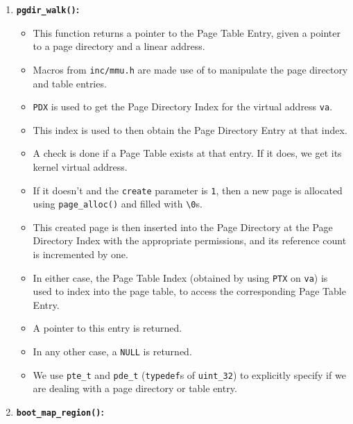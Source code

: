 \documentclass[]{article}
\begin{document}
\begin{enumerate}
\def\labelenumi{\arabic{enumi}.}
\itemsep1pt\parskip0pt
\item
  \textbf{\texttt{pgdir\_walk()}:}

  \begin{itemize}
  \itemsep1pt\parskip0pt
  \item
    This function returns a pointer to the Page Table Entry, given a
    pointer to a page directory and a linear address.
  \item
    Macros from \texttt{inc/mmu.h} are made use of to manipulate the
    page directory and table entries.
  \item
    \texttt{PDX} is used to get the Page Directory Index for the virtual
    address \texttt{va}.
  \item
    This index is used to then obtain the Page Directory Entry at that
    index.
  \item
    A check is done if a Page Table exists at that entry. If it does, we
    get its kernel virtual address.
  \item
    If it doesn't and the \texttt{create} parameter is \texttt{1}, then
    a new page is allocated using \texttt{page\_alloc()} and filled with
    \texttt{\textbackslash{}0}s.
  \item
    This created page is then inserted into the Page Directory at the
    Page Directory Index with the appropriate permissions, and its
    reference count is incremented by one.
  \item
    In either case, the Page Table Index (obtained by using \texttt{PTX}
    on \texttt{va}) is used to index into the page table, to access the
    corresponding Page Table Entry.
  \item
    A pointer to this entry is returned.
  \item
    In any other case, a \texttt{NULL} is returned.
  \item
    We use \texttt{pte\_t} and \texttt{pde\_t} (\texttt{typedef}s of
    \texttt{uint\_32}) to explicitly specify if we are dealing with a
    page directory or table entry.
  \end{itemize}
\item
  \textbf{\texttt{boot\_map\_region()}:}


\end{enumerate}
\end{document}
